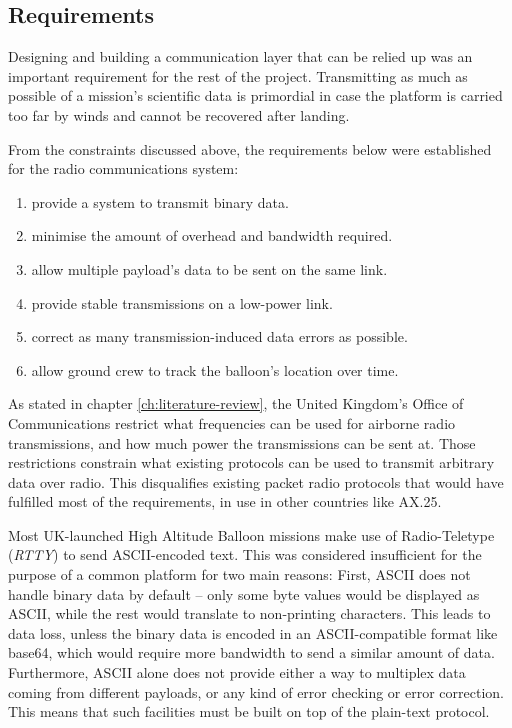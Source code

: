 \subsection{Requirements}
\label{ssec:requirements}

Designing and building a communication layer that can be relied up was an
important requirement for the rest of the project. Transmitting as much as
possible of a mission's scientific data is primordial in case the platform
is carried too far by winds and cannot be recovered after landing.

From the constraints discussed above, the requirements below were established
for the radio communications system:

\begin{enumerate}
\item provide a system to transmit binary data.
\item minimise the amount of overhead and bandwidth required.
\item allow multiple payload's data to be sent on the same link.
\item provide stable transmissions on a low-power link.
\item correct as many transmission-induced data errors as possible.
\item allow ground crew to track the balloon's location over time.
\end{enumerate}

As stated in chapter \ref{ch:literature-review}, the United Kingdom's Office
of Communications restrict what frequencies can be used for airborne
radio transmissions, and how much power the transmissions can be sent at.
Those restrictions constrain what existing protocols can be used to transmit
arbitrary data over radio. This disqualifies existing packet radio protocols
that would have fulfilled most of the requirements, in use in other countries
like AX.25. 

Most UK-launched High Altitude Balloon missions make use of Radio-Teletype
(\textit{RTTY}) to send ASCII-encoded text. This was considered insufficient
for the purpose of a common platform for two main reasons: First, ASCII does
not handle binary data by default -- only some byte values would be displayed
as ASCII, while the rest would translate to non-printing characters. This leads
to data loss, unless the binary data is encoded in an ASCII-compatible format
like base64, which would require more bandwidth to send a similar amount of
data. Furthermore, ASCII alone does not provide either a way to multiplex data
coming from different payloads, or any kind of error checking or error
correction. This means that such facilities must be built on top of the
plain-text protocol.

